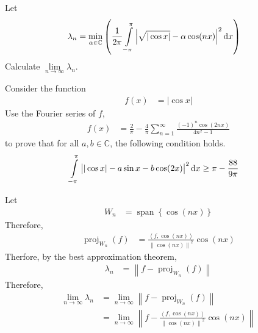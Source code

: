 \documentclass[fleqn, a4paper, 11pt, oneside]{amsart}
\theoremstyle{definition}
\theoremstyle{theorem}
\DeclareMathOperator{\proj}{proj}
\DeclareMathOperator{\setspan}{span}
\begin{document}
\begin{question}
	Let
	\begin{align*}
		\lambda_n &= \min\limits_{\alpha \in \mathbb{C}}\left( \frac{1}{2 \pi} \int\limits_{-\pi}^{\pi} \left| \sqrt{|\cos x|} - \alpha \cos(n x) \right|^2 \dif x \right)
	\end{align*}
	Calculate $\lim\limits_{n \to \infty} \lambda_n$.
\end{question}

\begin{question}
	Consider the function
	\begin{align*}
		f(x) &= |\cos x|
	\end{align*}
	Use the Fourier series of $f$,
	\begin{align*}
		f(x) &= \frac{2}{\pi} - \frac{4}{\pi} \sum\limits_{n = 1}^{\infty} \frac{(-1)^n \cos(2 n x)}{4 n^2 - 1}
	\end{align*}
	to prove that for all $a,b \in \mathbb{C}$, the following condition holds.
	\begin{align*}
		\int\limits_{-\pi}^{\pi} \left| |\cos x| - a \sin x - b \cos(2 x) \right|^2 \dif x &\ge \pi - \frac{88}{9 \pi}
	\end{align*}
\end{question}

\begin{solution}
	Let
	\begin{align*}
		W_n &= \setspan\left\{ \cos(n x) \right\}
	\end{align*}
	Therefore,
	\begin{align*}
		\proj_{W_n}(f) &= \frac{\left\langle f,\cos(n x) \right\rangle}{\left\| \cos(n x) \right\|^2} \cos(n x)
	\end{align*}
	Therfore, by the best approximation theorem,
	\begin{align*}
		\lambda_n &= \left\| f - \proj_{W_n}(f) \right\|
	\end{align*}
	Therefore,
	\begin{align*}
		\lim\limits_{n \to \infty} \lambda_n &= \lim\limits_{n \to \infty} \left\| f - \proj_{W_n}(f) \right\|\\
		&= \lim\limits_{n \to \infty} \left\| f - \frac{\left\langle f,\cos(n x) \right\rangle}{\left\| \cos(n x) \right\|^2} \cos(n x) \right\|
	\end{align*}
\end{solution}
\end{document}

